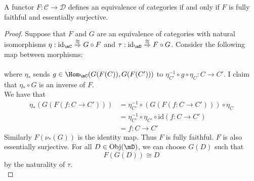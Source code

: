 \documentclass[a4paper]{article}
\begin{document}
\begin{prp}{}{} A functor $F:\mathcal{C}\to\mathcal{D}$ defines an equivalence of categories if and only if $F$ is fully faithful and essentially surjective. 
\begin{proof}
Suppose that $F$ and $G$ are an equivalence of categories with natural isomorphisms $\eta:\text{id}_\mC\overset{\cong}{\Rightarrow}G\circ F$ and $
\tau:\text{id}_\mD\overset{\cong}{\Rightarrow}F\circ G$. Consider the following map between morphisms: \\
\\
where $\eta_\ast$ sends $g\in\Hom_\mC(G(F(C)),G(F(C')))$ to $\eta_{C'}^{-1}\circ g\circ\eta_C:C\to C'$. I claim that $\eta_\ast\circ G$ is an inverse of $F$. \\
We have that 
\begin{align*}
\eta_\ast(G(F(f:C\to C')))&=\eta_{C'}^{-1}\circ(G(F(f:C\to C')))\circ\eta_C\\
&=\eta_{C'}^{-1}\circ\eta_{C'}\circ\text{id}(f:C\to C')\tag{$\nu$ is natural}\\
&=f:C\to C'
\end{align*}
Similarly $F(\nu_\ast(G))$ is the identity map. Thus $F$ is fully faithful. $F$ is also essentially surjective. For all $D\in\text{Obj}(\mD)$, we can choose $G(D)$ such that $$F(G(D))\cong D$$ by the naturality of $\tau$. \\


\end{proof}
\end{prp}
\end{document}
